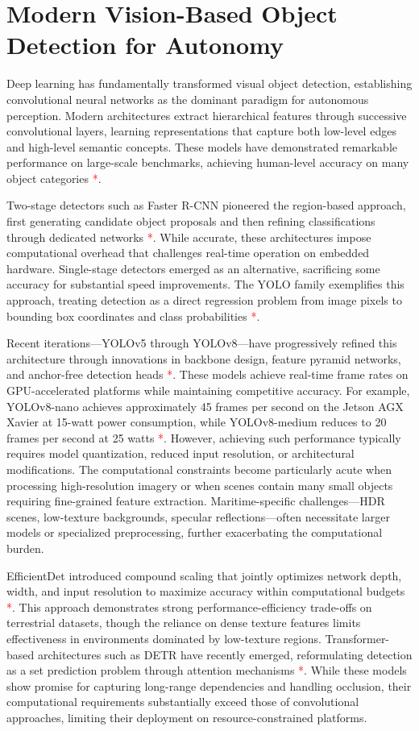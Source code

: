 \documentclass[../main.tex]{subfiles}
\begin{document}
\section{Modern Vision-Based Object Detection for Autonomy}

Deep learning has fundamentally transformed visual object detection, establishing convolutional neural networks as the dominant paradigm for autonomous perception. Modern architectures extract hierarchical features through successive convolutional layers, learning representations that capture both low-level edges and high-level semantic concepts. These models have demonstrated remarkable performance on large-scale benchmarks, achieving human-level accuracy on many object categories \textcolor{red}{*}.

Two-stage detectors such as Faster R-CNN pioneered the region-based approach, first generating candidate object proposals and then refining classifications through dedicated networks \textcolor{red}{*}. While accurate, these architectures impose computational overhead that challenges real-time operation on embedded hardware. Single-stage detectors emerged as an alternative, sacrificing some accuracy for substantial speed improvements. The YOLO family exemplifies this approach, treating detection as a direct regression problem from image pixels to bounding box coordinates and class probabilities \textcolor{red}{*}.

Recent iterations—YOLOv5 through YOLOv8—have progressively refined this architecture through innovations in backbone design, feature pyramid networks, and anchor-free detection heads \textcolor{red}{*}. These models achieve real-time frame rates on GPU-accelerated platforms while maintaining competitive accuracy. For example, YOLOv8-nano achieves approximately 45 frames per second on the Jetson AGX Xavier at 15-watt power consumption, while YOLOv8-medium reduces to 20 frames per second at 25 watts \textcolor{red}{*}. However, achieving such performance typically requires model quantization, reduced input resolution, or architectural modifications. The computational constraints become particularly acute when processing high-resolution imagery or when scenes contain many small objects requiring fine-grained feature extraction. Maritime-specific challenges—HDR scenes, low-texture backgrounds, specular reflections—often necessitate larger models or specialized preprocessing, further exacerbating the computational burden.

EfficientDet introduced compound scaling that jointly optimizes network depth, width, and input resolution to maximize accuracy within computational budgets \textcolor{red}{*}. This approach demonstrates strong performance-efficiency trade-offs on terrestrial datasets, though the reliance on dense texture features limits effectiveness in environments dominated by low-texture regions. Transformer-based architectures such as DETR have recently emerged, reformulating detection as a set prediction problem through attention mechanisms \textcolor{red}{*}. While these models show promise for capturing long-range dependencies and handling occlusion, their computational requirements substantially exceed those of convolutional approaches, limiting their deployment on resource-constrained platforms.
\end{document}
